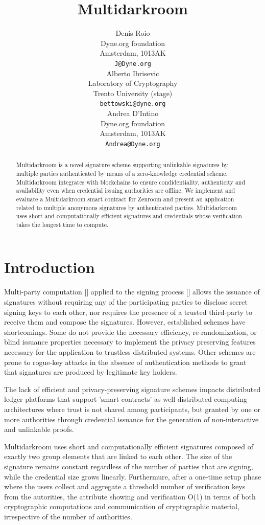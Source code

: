 \documentclass{article}
\title{Multidarkroom}
\author{
    Denis Roio \\
	Dyne.org foundation \\
	Amsterdam, 1013AK \\
	\texttt{J@Dyne.org} \\
    \And
	Alberto Ibrisevic \\
	Laboratory of Cryptography\\
	Trento University (stage)\\
	\texttt{bettowski@dyne.org} \\
    \And
    Andrea D'Intino \\
    Dyne.org foundation \\
    Amsterdam, 1013AK \\
    \texttt{Andrea@Dyne.org} \\
}
\begin{document}
\maketitle

\begin{abstract}
  Multidarkroom is a novel signature scheme supporting unlinkable
  signatures by multiple parties authenticated by means of a
  zero-knowledge credential scheme. Multidarkroom integrates with
  blockchains to ensure condidentiality, authenticity and availability
  even when credential issuing authorities are offline. We implement
  and evaluate a Multidarkroom smart contract for Zenroom and present
  an application related to multiple anonymous signatures by
  authenticated parties. Multidarkroom uses short and computationally
  efficient signatures and credentials whose verification takes the
  longest time to compute.
\end{abstract}




\section{Introduction}

Multi-party computation [] applied to the signing process [] allows
the issuance of signatures without requiring any of the participating
parties to disclose secret signing keys to each other, nor requires
the presence of a trusted third-party to receive them and compose the
signatures. However, established schemes have shortcomings. Some do
not provide the necessary efficiency, re-randomization, or blind
issuance properties necessary to implement the privacy preserving
features necessary for the application to trustless distributed
systems. Other schemes are prone to rogue-key attacks \citep{ietf-bls}
in the absence of authentication methods to grant that signatures are
produced by legitimate key holders.

The lack of efficient and privacy-preserving signature schemes impacts
distributed ledger platforms that support 'smart contracts' as well
distributed computing architectures where trust is not shared among
participants, but granted by one or more authorities through
credential issuance for the generation of non-interactive and
unlinkable proofs.

Multidarkroom uses short and computationally efficient signatures
composed of exactly two group elements that are linked to each
other. The size of the signature remains constant regardless of the
number of parties that are signing, while the credential size grows
linearly. Furthermure, after a one-time setup phase where the users
collect and aggregate a threshold number of verification keys from the
autorities, the attribute showing and verification O(1) in terms of
both cryptographic computations and communication of cryptographic
material, irrespective of the number of authorities.
\end{document}
